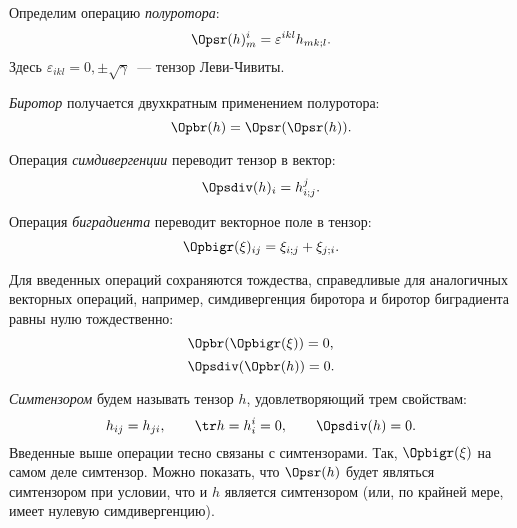 \documentclass[\docroot/reports/draft/report.tex]{subfiles}
\begin{document}
    Определим операцию \textit{полуротора}:
    \begin{equation}\label{eq:sr}
        \Opsr(h)^i_m = \varepsilon^{ikl} h_{mk;l} .
    \end{equation}
    Здесь $\varepsilon_{ikl} = 0, \pm \sqrt{\gamma}$~--- тензор Леви-Чивиты.

    \textit{Биротор} получается двухкратным применением полуротора:
    \begin{equation}\label{eq:br}
        \Opbr(h) = \Opsr(\Opsr(h)) .
    \end{equation}

    Операция \textit{симдивергенции} переводит тензор в вектор:
    \begin{equation}\label{eq:sdiv}
        \Opsdiv(h)_i = h^j_{i;j} .
    \end{equation}

    Операция \textit{биградиента} переводит векторное поле в тензор:
    \begin{equation}\label{eq:bigr}
        \Opbigr(\xi)_{ij} = \xi_{i;j} + \xi_{j;i}.
    \end{equation}

    Для введенных операций сохраняются тождества, справедливые для аналогичных векторных операций, например, симдивергенция биротора и биротор биградиента равны нулю тождественно:
    \begin{equation}\label{eq:br-of-bigr}
        \Opbr(\Opbigr(\xi)) = 0,
    \end{equation}
    \begin{equation}\label{eq:sdiv-of-br}
        \Opsdiv(\Opbr(h)) = 0.
    \end{equation}

    \textit{Симтензором} будем называть тензор $h$, удовлетворяющий трем свойствам:
    \begin{equation*}
        h_{ij} = h_{ji}, \qquad
        \tr h = h^i_i = 0 , \qquad
        \Opsdiv(h) = 0 .
    \end{equation*}
    Введенные выше операции тесно связаны с симтензорами. Так, $\Opbigr(\xi)$ на самом деле симтензор. Можно показать, что $\Opsr(h)$ будет являться симтензором при условии, что и $h$ является симтензором (или, по крайней мере, имеет нулевую симдивергенцию).
\end{document}
